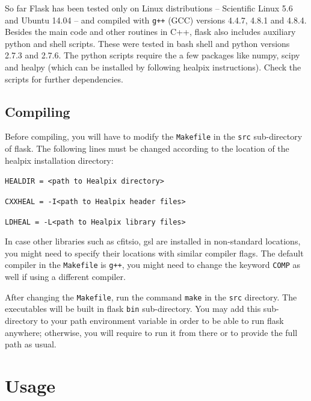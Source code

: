 \documentclass[12pt]{book} %
\begin{document}
So far {\sc Flask} has been tested only on Linux distributions -- Scientific Linux 5.6 and Ubuntu 14.04 -- 
and compiled with {\tt g++} (GCC) versions 4.4.7, 4.8.1 and 4.8.4.   
Besides the main code and other routines in {\sc C++}, {\sc flask} also includes auxiliary {\sc python} 
and {\sc shell} scripts. These were tested in {\sc bash} shell and {\sc python} versions 2.7.3 and 2.7.6. 
The {\sc python} scripts require the a few packages like {\sc numpy}, {\sc scipy} and {\sc healpy} 
(which can be installed by following {\sc healpix} instructions). Check the scripts for further dependencies.  

\section{Compiling}
\label{sec:compiling}

Before compiling, you will have to modify the {\tt Makefile} in the {\tt src} sub-directory of {\sc flask}. 
The following lines must be changed according to the location of the {\sc healpix} installation directory:

\vspace{0.5cm}

\noindent
{\tt HEALDIR = <path to Healpix directory>}

\noindent
{\tt CXXHEAL = -I<path to Healpix header files>}

\noindent
{\tt LDHEAL  = -L<path to Healpix library files>} 
\vspace{0.5cm}

\noindent
In case other libraries such as {\sc cfitsio}, {\sc gsl} are installed in non-standard locations, 
you might need to specify their locations with similar compiler flags. The default compiler in the 
{\tt Makefile} is {\tt g++}, you might need to change the keyword {\tt COMP} as well if using a 
different compiler.

After changing the {\tt Makefile}, run the command {\tt make} in the {\tt src} directory. The 
executables will be built in {\sc flask} {\tt bin} sub-directory. You may add this sub-directory to 
your {\sc path} environment variable in order to be able to run {\sc flask} anywhere; otherwise, 
you will require to run it from there or to provide the full path as usual. 


\chapter{Usage}
\label{sec:usage}
\end{document}
